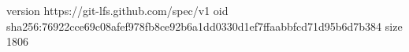 version https://git-lfs.github.com/spec/v1
oid sha256:76922cce69c08afef978fb8ce92b6a1dd0330d1ef7ffaabbfcd71d95b6d7b384
size 1806
